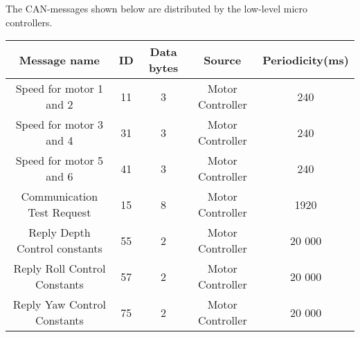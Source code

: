 The CAN-messages shown below are distributed by the low-level micro controllers.
\begin{center}
    \begin{tabular}{|c|c|c|c|c|}
    \hline
   \textbf{Message name} & \textbf{ID}    & \textbf{Data bytes} & \textbf{Source} & \textbf{Periodicity(ms)} \\ \hline
    Speed for motor 1 and 2 & 11    & 3     & Motor Controller & 240 \\ \hline
    Speed for motor 3 and 4 & 31    & 3     & Motor Controller & 240 \\ \hline
    Speed for motor 5 and 6 & 41    & 3     & Motor Controller & 240 \\ \hline
    Communication Test Request & 15    & 8     & Motor Controller & 1920 \\ \hline
    Reply Depth Control constants & 55    & 2     & Motor Controller & 20 000 \\ \hline
    Reply Roll Control Constants & 57    & 2     & Motor Controller & 20 000 \\ \hline
    Reply Yaw Control Constants & 75    & 2     & Motor Controller & 20 000 \\ \hline
    \end{tabular}
\end{center}

